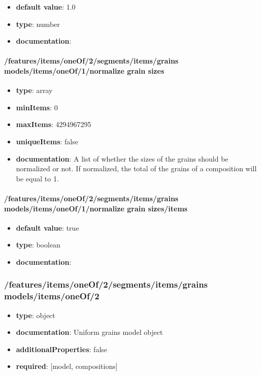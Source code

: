 \begin{itemize}\item {\bf default value}: 1.0
\item {\bf type}: number
\item {\bf documentation}: 
\end{itemize}\paragraph{/features/items/oneOf/2/segments/items/grains models/items/oneOf/1/normalize grain sizes}
\begin{itemize}\item {\bf type}: array
\item {\bf minItems}: 0
\item {\bf maxItems}: 4294967295
\item {\bf uniqueItems}: false
\item {\bf documentation}: A list of whether the sizes of the grains should be normalized or not. If normalized, the total of the grains of a composition will be equal to 1.
\end{itemize}\paragraph{/features/items/oneOf/2/segments/items/grains models/items/oneOf/1/normalize grain sizes/items}
\begin{itemize}\item {\bf default value}: true
\item {\bf type}: boolean
\item {\bf documentation}: 
\end{itemize}\subsubsection{/features/items/oneOf/2/segments/items/grains models/items/oneOf/2}
\begin{itemize}\item {\bf type}: object
\item {\bf documentation}: Uniform grains model object
\item {\bf additionalProperties}: false
\item {\bf required}: [model, compositions]\end{itemize}

